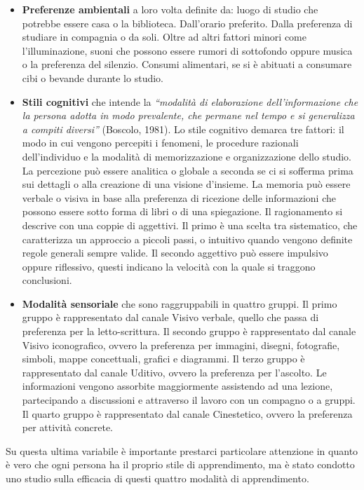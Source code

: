 \begin{itemize}
  \item \textbf{Preferenze ambientali} a loro volta definite da: luogo di studio che potrebbe essere casa o la biblioteca. Dall'orario preferito. Dalla preferenza di studiare in compagnia o da soli. Oltre ad altri fattori minori come l'illuminazione, suoni che possono essere rumori di sottofondo oppure musica o la preferenza del silenzio. Consumi alimentari, se si è abituati a consumare cibi o bevande durante lo studio.
  \item \textbf{Stili cognitivi} che intende la \textit{“modalità di elaborazione dell’informazione che la persona adotta in modo prevalente, che permane nel tempo e si generalizza a compiti diversi”} (Boscolo, 1981).
  Lo stile cognitivo demarca tre fattori: il modo in cui vengono percepiti i fenomeni, le procedure razionali dell'individuo e la modalità di memorizzazione e organizzazione dello studio.
  La percezione può essere analitica o globale a seconda se ci si sofferma prima sui dettagli o alla creazione di una visione d'insieme.
  La memoria può essere verbale o visiva in base alla preferenza di ricezione delle informazioni che possono essere sotto forma di libri o di una spiegazione.
  Il ragionamento si descrive con una coppie di aggettivi. Il primo è una scelta tra sistematico, che caratterizza un approccio a piccoli passi, o intuitivo quando vengono definite regole generali sempre valide. Il secondo aggettivo può essere impulsivo oppure riflessivo, questi indicano la velocità con la quale si traggono conclusioni.
  \item \textbf{Modalità sensoriale} che sono raggruppabili in quattro gruppi. Il primo gruppo è rappresentato dal canale Visivo verbale, quello che passa di preferenza per la letto-scrittura. Il secondo gruppo è rappresentato dal canale Visivo iconografico, ovvero la preferenza per immagini, disegni, fotografie, simboli, mappe concettuali, grafici e diagrammi. Il terzo gruppo è rappresentato dal canale Uditivo, ovvero la preferenza per l’ascolto. Le informazioni vengono assorbite maggiormente assistendo ad una lezione, partecipando a discussioni e attraverso il lavoro con un compagno o a gruppi. Il quarto gruppo è rappresentato dal canale Cinestetico, ovvero la preferenza per attività concrete.
\end{itemize}
Su questa ultima variabile è importante prestarci particolare attenzione in quanto è vero che ogni persona ha il proprio stile di apprendimento, ma è stato condotto uno studio sulla efficacia di questi quattro modalità di apprendimento.
